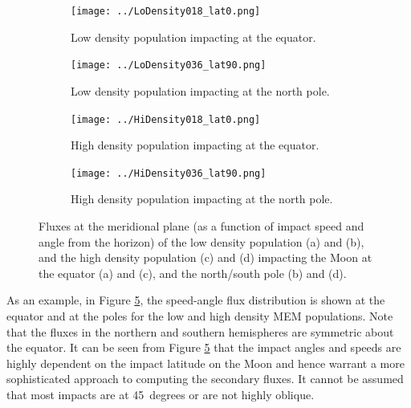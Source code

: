 \documentclass{article}
\begin{document}
\begin{figure}[!htb]
	\begin{subfigure}{.485\textwidth}
		\centering
		\texttt{[image: ../LoDensity018\_lat0.png]}  
		\caption{Low density population impacting at the equator.}
		\label{fig:sub-LoDensity018_lat0}
	\end{subfigure}
	\begin{subfigure}{.485\textwidth}
		\centering
		\texttt{[image: ../LoDensity036\_lat90.png]}  
		\caption{Low density population impacting at the north pole.}
		\label{fig:sub-LoDensity036_lat90}
	\end{subfigure}
	\newline
	\begin{subfigure}{.485\textwidth}
		\centering
		\texttt{[image: ../HiDensity018\_lat0.png]}  
		\caption{High density population impacting at the equator.}
		\label{fig:sub-HiDensity018_lat0}
	\end{subfigure}
	\begin{subfigure}{.485\textwidth}
		\centering
		\texttt{[image: ../HiDensity036\_lat90.png]}  
		\caption{High density population impacting at the north pole.}
		\label{fig:sub-HiDensity036_lat90}
	\end{subfigure}
	\caption{Fluxes at the meridional plane (as a function of impact speed and angle from the horizon) of the low density population (a) and (b), and the high density population (c) and (d) impacting the Moon at the equator (a) and (c), and the north/south pole (b) and (d).}
	\label{fig:latitudinal_dependence}
\end{figure}

As an example, in Figure \ref{fig:latitudinal_dependence}, the speed-angle flux distribution is shown at the equator and at the poles for the low and high density MEM populations. Note that the fluxes in the northern and southern hemispheres are symmetric about the equator. It can be seen from Figure \ref{fig:latitudinal_dependence} that the impact angles and speeds are highly dependent on the impact latitude on the Moon and hence warrant a more sophisticated approach to computing the secondary fluxes. It cannot be assumed that most impacts are at 45~degrees or are not highly oblique.%
\end{document}
